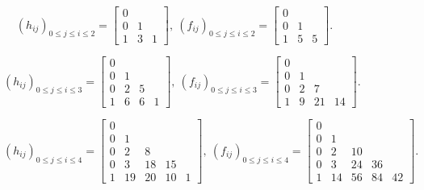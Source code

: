 \documentclass[11pt]{amsart}
\theoremstyle{plain}
\numberwithin{lemma}{\DefaultNumberTheoremWithin}
\numberwithin{theorem}{\DefaultNumberTheoremWithin}
\numberwithin{corollary}{\DefaultNumberTheoremWithin}
\numberwithin{proposition}{\DefaultNumberTheoremWithin}
\numberwithin{conjecture}{\DefaultNumberTheoremWithin}
\theoremstyle{definition}
\numberwithin{definition}{\DefaultNumberTheoremWithin}
\numberwithin{question}{\DefaultNumberTheoremWithin}
\numberwithin{problem}{\DefaultNumberTheoremWithin}
\theoremstyle{remark}
\numberwithin{remark}{\DefaultNumberTheoremWithin}
\numberwithin{example}{\DefaultNumberTheoremWithin}
\numberwithin{claim}{\DefaultNumberTheoremWithin}
\begin{document}
\begin{figure}[H]
{\small

$$ (h_{ij})_{0 \leq j \leq i \leq 2} = \left[\begin{array}{ccc}
 0 &    &     \\
  0 & 1  &    \\
  1 & 3  & 1   
  \end{array}\right],\
(f_{ij})_{0 \leq j \leq i \leq 2} = \left[
 \begin{array}{ccccc}
  0 &    &     \\
  0 & 1  &     \\
  1 & 5  & 5   
  \end{array}\right].$$

 $$ (h_{ij})_{0 \leq j \leq i \leq 3} = \left[\begin{array}{cccc}
 0 &    &   &  \\
  0 & 1  &  &  \\
  0& 2  & 5 & \\
  1 & 6 & 6 & 1 
  \end{array}\right],\
(f_{ij})_{0 \leq j \leq i \leq 3} = \left[
 \begin{array}{ccccc}
  0 &    &   &  \\
  0 & 1  &   &  \\
  0 & 2  & 7 & \\
  1 & 9 & 21 & 14 
  \end{array}\right].$$
  
$$ (h_{ij})_{0 \leq j \leq i \leq 4} = \left[\begin{array}{ccccc}
 0 &    &   &  & \\
  0 & 1  &  &  & \\
  0& 2  & 8 & & \\
  0 & 3 & 18 & 15 & \\
  1 & 19 & 20 & 10 & 1
  \end{array}\right],\
(f_{ij})_{0 \leq j \leq i \leq 4} = \left[
 \begin{array}{cccccc}
  0 &    &   &  & \\
  0 & 1  &   &  & \\
  0 & 2  & 10 & & \\
  0& 3 & 24 & 36 & \\
  1 & 14 & 56 & 84 & 42 
  \end{array}\right].$$

}
\end{figure}
\end{document}
